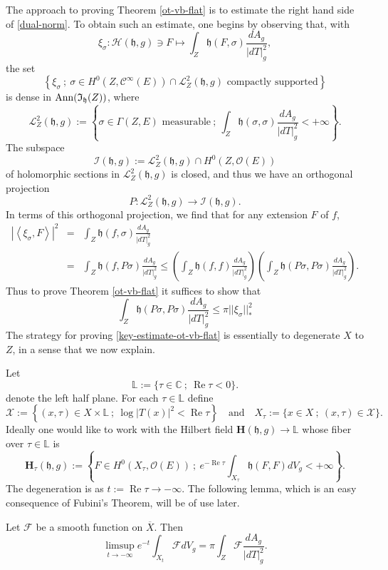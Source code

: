 \documentclass[12pt,hidelinks]{amsart}
\newcommand{\cF}{{\mathcal F}}
\newcommand{\cO}{{\mathcal O}}
\newcommand{\sC}{{\mathscr C}}
\newcommand{\sH}{{\mathscr H}}
\newcommand{\sI}{{\mathscr I}}
\newcommand{\sL}{{\mathscr L}}
\newcommand{\sX}{{\mathscr X}}
\newcommand{\fI}{\mathfrak{I}}
\newcommand{\fh}{{\mathfrak h}}
\newcommand{\bbC}{{\mathbb C}}
\newcommand{\bbL}{{\mathbb L}}
\renewcommand{\Re}{\operatorname{Re}}
\newcommand{\re}{\Re}
\begin{document}
The approach to proving Theorem \ref{ot-vb-flat} is to estimate the right hand side of \eqref{dual-norm}.  To obtain such an estimate, one begins by observing that, with 
\[
\xi _{\sigma} : \sH (\fh , g) \ni F \mapsto \int _Z \fh (F, \sigma) \frac{dA_g}{|dT|^2_g},
\]
the set 
\[
\left \{ \xi _{\sigma}\ ;\ \sigma \in H^0(Z, \sC^{\infty}(E)) \cap \sL ^2_Z (\fh, g) \text{ compactly supported}\right \}
\]
is dense in ${\rm Ann}(\fI _{\fh}(Z))$, where 
\[
\sL ^2_Z (\fh, g) := \left \{ \sigma \in \Gamma (Z, E) \text{ measurable} \ ;\ \int _Z \fh (\sigma, \sigma ) \frac{dA_g}{|dT|^2_g} < +\infty \right \}.
\]
The subspace 
\[
\sI (\fh , g) := \sL ^2 _Z (\fh , g) \cap H^0(Z, \cO(E))
\]
of holomorphic sections in $\sL ^2_Z(\fh, g)$ is closed, and thus we have an orthogonal projection 
\[
P : \sL ^2_Z (\fh, g) \to \sI (\fh , g).
\]
In terms of this orthogonal projection, we find that for any extension $F$ of $f$, 
\begin{eqnarray*}
\left | \left < \xi _{\sigma} , F \right > \right |^2 &=&  \int _Z \fh (f, {\sigma}) \frac{dA_g}{|dT|^2_g} \\
&=&  \int _Z \fh (f,P {\sigma}) \frac{dA_g}{|dT|^2_g} \le \left ( \int _Z \fh (f,f) \frac{dA_g}{|dT|^2_g} \right ) \left ( \int _Z \fh (P{\sigma}, P{\sigma}) \frac{dA_g}{|dT|^2_g} \right ).
\end{eqnarray*}
Thus to prove Theorem \ref{ot-vb-flat} it suffices to show that 
\begin{equation}\label{key-estimate-ot-vb-flat}
\int _Z \fh (P{\sigma}, P{\sigma}) \frac{dA_g}{|dT|^2_g} \le \pi ||\xi _{\sigma}||^2_*
\end{equation}
The strategy for proving \eqref{key-estimate-ot-vb-flat} is essentially to degenerate $X$ to $Z$, in a sense that we now explain.

Let 
\[
\bbL := \{ \tau \in \bbC\ ;\ \Re \tau < 0 \}.
\]
denote the left half plane.  For each $\tau \in \bbL$ define 
\[
\sX := \left \{ (x, \tau) \in X \times \bbL \ ;\ \log |T(x)|^2 < \Re \tau \right \} \quad \text{and} \quad X_{\tau} := \{ x \in X\ ;\ (x,\tau) \in \sX \}.
\]
Ideally one would like to work with the Hilbert field $\mathbf{H}(\fh, g) \to \bbL$ whose fiber over $\tau \in \bbL$ is 
\[
\mathbf{H}_{\tau}(\fh , g) := \left \{ F \in H^0(X_{\tau}, \cO (E))\ ;\ e^{-\Re \tau} \int _{X_{\tau}} \fh (F,F) dV_g < +\infty \right \}.
\]
The degeneration is as $t := \re \tau \to -\infty$.  The following lemma, which is an easy consequence of Fubini's Theorem, will be of use later.  

\begin{lem}\label{fubini}
Let $\cF$ be a smooth function on $\overline{X}$.  Then 
\[
\limsup _{t \to -\infty} e^{-t} \int _{X_t} \cF dV_g= \pi \int _Z \cF\frac{dA_g}{|dT|^2_g}.
\]
\end{lem}
\end{document}
